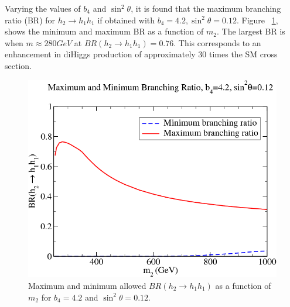 \indent Varying the values of ${b_{4}}$ and ${\sin^{2}{\theta}}$, it is found that the maximum branching ratio (BR) for ${h_{2}\rightarrow h_{1}h_{1}}$ if obtained with ${b_{4} = 4.2, \sin^{2}\theta = 0.12}$. Figure ~\ref{fig:Ian6}, shows the minimum and maximum BR as a function of ${m_{2}}$. The largest BR is when ${m \approx 280 GeV}$ at ${BR(h_{2}\rightarrow h_{1}h_{1}) = 0.76}$. This corresponds to an enhancement in diHiggs production of approximately 30 times the SM cross section.

\begin{figure}[h]
\begin{center}
\includegraphics[scale=0.5]{figures/Ian6}
\caption{Maximum and minimum allowed ${BR(h_{2}\rightarrow h_{1}h_{1})}$ as a function of ${m_{2}}$ for ${b_{4} = 4.2}$ and ${\sin^{2}{\theta} = 0.12}$.}
\label{fig:Ian6}
\end{center}
\end{figure}
